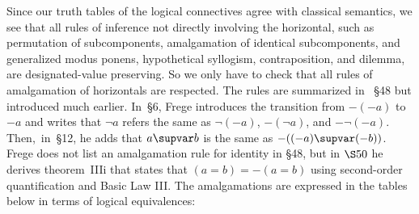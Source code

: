 \documentclass{preprint}
\renewcommand{\to}{\supvar}
\begin{document}
Since our truth tables of the logical connectives agree with classical semantics, 
we see that all rules of inference not directly involving the horizontal, such as 
permutation of subcomponents, amalgamation of identical subcomponents, and generalized modus ponens, hypothetical syllogism, contraposition, and dilemma, 
are designated-value preserving. 
So we only have to check that all rules of amalgamation of horizontals are respected. The rules are summarized in \gga~\S48 but introduced much earlier. 
In~\S6, Frege introduces the transition from $- (- a)$ to $-a$ and writes that $\neg a$ refers the same as $\neg(-a)$, $- (\neg a)$, and $- \neg (- a)$. Then,~in~\S12, he adds that $a \to b$ is the same as $- ((-a) \to (-b))$. Frege does not list an amalgamation rule for identity in \S48, but in $\S50$ he derives theorem~IIIi that states that $(a = b) = -(a = b)$ using second-order quantification and Basic Law III. 
The amalgamations are expressed in the tables below in terms of logical equivalences:
\end{document}
